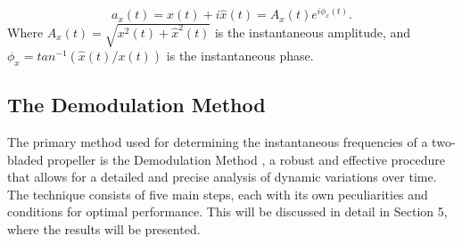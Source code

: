 \documentclass[10pt,fleqn,a4paper,twoside]{article}
\begin{document}
\begin{equation}
    a_{x} (t) = x(t) + i\hat{x}(t) = A_{x}(t)e^{i\phi_{x}(t)}.
    \label{eq2}
\end{equation}
Where $A_{x}(t) = \sqrt{x^2 (t)+ \hat{x}^2 (t)}$ is the instantaneous amplitude, and $\phi_{x} = tan^{-1}(\hat{x}(t)/x(t))$ is the instantaneous phase.

\subsection{The Demodulation Method}
The primary method used for determining the instantaneous frequencies of a two-bladed propeller is the Demodulation Method \citep{BONNARDOT2005766}, a robust and effective procedure that allows for a detailed and precise analysis of dynamic variations over time. The technique consists of five main steps, each with its own peculiarities and conditions for optimal performance. This will be discussed in detail in Section 5, where the results will be presented.
\end{document}
